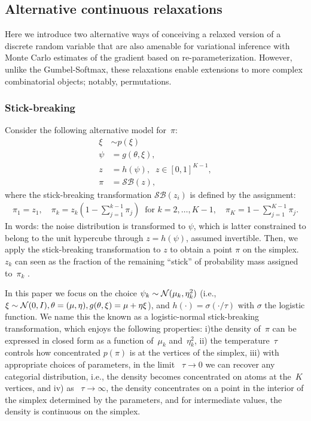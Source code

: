 \documentclass{article}
\begin{document}
\subsection{Alternative continuous relaxations}
\label{sub:alternative}
Here we introduce two alternative ways of conceiving a relaxed version of a discrete random variable that are also amenable for variational inference with Monte Carlo estimates of the gradient based on re-parameterization. However, unlike the Gumbel-Softmax, these relaxations enable extensions to more complex combinatorial objects; notably, permutations.

\subsubsection{Stick-breaking}
Consider the following alternative model for~${\pi}$:
\begin{align}
  \xi &\sim p(\xi) \\
  \psi & = g(\theta, \xi),  \\
  z &  = h(\psi), \;\; z\in[0,1]^{K-1}, \\ 
   {\pi} &=\mathcal{SB}(z), 
  \end{align}
 where the stick-breaking transformation $\mathcal{SB}(z_i)$ is defined by the assignment:
\begin{align} {\pi}_1 =z_1, \quad {\pi}_k = z_k \left(1- \sum_{j=1}^{k-1} {\pi}_j\right) \;\; \text{for } k=2, \ldots, K-1,  \quad {\pi}_K = 1- \sum_{j=1}^{K-1} {\pi}_j. 
\end{align}
In words: the noise distribution is transformed to $\psi$, which is latter constrained to belong to the unit hypercube through $z = h(\psi)$, assumed invertible. Then, we apply the stick-breaking transformation to $z$ to obtain a point $\pi$ on the simplex. $z_k$ can seen as the fraction of the remaining ``stick'' of probability mass assigned to~${\pi}_k$ \citep{linderman2015dependent}.


In this paper we focus on the choice $\psi_k \sim \mathcal{N}(\mu_k, \eta_k^2) $ (i.e., $\xi\sim\mathcal{N}(0,I), \theta = (\mu,\eta), g(\theta, \xi) = \mu + \eta \xi$), and $h(\cdot) = \sigma(\cdot /\tau)$ with $\sigma$ the logistic function. We name this the known as a logistic-normal stick-breaking transformation, which enjoys the following properties: i)the density of~${\pi}$ can be expressed in closed form as a function of~$\mu_k$ and~$\eta_k^2$, ii) the temperature~$\tau$ controls how
concentrated $p(\pi)$ is at the vertices of the simplex, iii) with appropriate choices of parameters, in the limit ~$\tau \to 0$ we can recover any categorial distribution, i.e., the density becomes concentrated on atoms at the~$K$ vertices, and iv) as ~$\tau \to \infty$, the density concentrates on a point in the interior of the simplex determined by the parameters, and for intermediate values, the density is
continuous on the simplex. 
\end{document}
